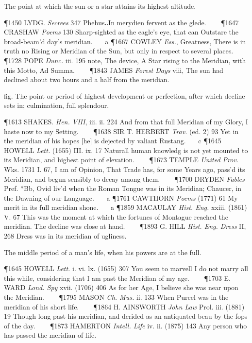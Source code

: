 \begin{description}[wide, labelwidth=!, labelindent=0pt]
\begin{myenumerate}
 The point at which the sun or a star attains its highest altitude.

\P 1450 LYDG.  \textit{Secrees} 347 Phebus‥In merydien fervent as the glede.    
\P 1647 CRASHAW  \textit{Poems} 130 Sharp-sighted as the eagle's eye, that can Outstare the broad-beam'd day's meridian.    a 
\P 1667 COWLEY  \textit{Ess.}, Greatness, There is in truth no Rising or Meridian of the Sun, but only in respect to several places.    
\P 1728 POPE  \textit{Dunc.} iii. 195 note, The device, A Star rising to the Meridian, with this Motto, Ad Summa.    
\P 1843 JAMES  \textit{Forest Days} viii, The sun had declined about two hours and a half from the meridian.

 fig. The point or period of highest development or perfection, after which decline sets in; culmination, full splendour.

\P 1613 SHAKES.  \textit{Hen. VIII}, iii. ii. 224 And from that full Meridian of my Glory, I haste now to my Setting.    
\P 1638 SIR T. HERBERT  \textit{Trav.} (ed. 2) 93 Yet in the meridian of his hopes [he] is dejected by valiant Rustang.    c 
\P 1645 HOWELL  \textit{Lett.} (1655) III. ix. 17 Naturall human knowledg is not yet mounted to its Meridian, and highest point of elevation.    
\P 1673 TEMPLE  \textit{United Prov.} Wks. 1731 I. 67,  I am of Opinion, That Trade has, for some Years ago, pass'd its Meridian, and begun sensibly to decay among them.    
\P 1700 DRYDEN  \textit{Fables} Pref. *Bb, Ovid liv'd when the Roman Tongue was in its Meridian; Chaucer, in the Dawning of our Language.    a 
\P 1761 CAWTHORN  \textit{Poems} (1771) 61 My merit in its full meridian shone.    a 
\P 1859 MACAULAY  \textit{Hist. Eng.} xxiii. (1861) V. 67 This was the moment at which the fortunes of Montague reached the meridian. The decline was close at hand.    
\P 1893 G. HILL  \textit{Hist. Eng. Dress} II, 268 Dress was in its meridian of ugliness.

 The middle period of a man's life, when his powers are at the full.

\P 1645 HOWELL  \textit{Lett.} i. vi. lx. (1655) 307 You seem to marvell I do not marry all this while, considering that I am past the Meridian of my age.    
\P 1703 E. WARD  \textit{Lond. Spy} xvii. (1706) 406 As for her Age, I believe she was near upon the Meridian.    
\P 1795 MASON  \textit{Ch. Mus.} ii. 133 When Purcel was in the meridian of his short life.    
\P 1864 H. AINSWORTH  \textit{John Law} Prol. iii. (1881) 19 Though long past his meridian, and derided as an antiquated beau by the fops of the day.    
\P 1873 HAMERTON  \textit{Intell. Life} iv. ii. (1875) 143 Any person who has passed the meridian of life.


\end{myenumerate}
\end{description}
